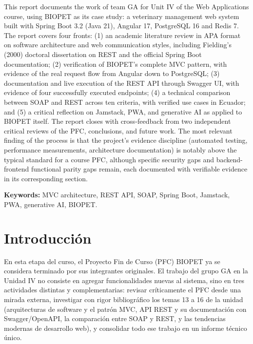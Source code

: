 \documentclass[11pt,a4paper]{article}
\begin{document}
This report documents the work of team GA for Unit IV of the Web
Applications course, using BIOPET as its case study: a veterinary
management web system built with Spring Boot 3.2 (Java 21), Angular 17,
PostgreSQL 16 and Redis 7. The report covers four fronts: (1) an academic
literature review in APA format on software architecture and web
communication styles, including Fielding's (2000) doctoral dissertation on
REST and the official Spring Boot documentation; (2) verification of
BIOPET's complete MVC pattern, with evidence of the real request flow from
Angular down to PostgreSQL; (3) documentation and live execution of the
REST API through Swagger UI, with evidence of four successfully executed
endpoints; (4) a technical comparison between SOAP and REST across ten
criteria, with verified use cases in Ecuador; and (5) a critical reflection
on Jamstack, PWA, and generative AI as applied to BIOPET itself. The report
closes with cross-feedback from two independent critical reviews of the
PFC, conclusions, and future work. The most relevant finding of the process
is that the project's evidence discipline (automated testing, performance
measurements, architecture documentation) is notably above the typical
standard for a course PFC, although specific security gaps and
backend-frontend functional parity gaps remain, each documented with
verifiable evidence in its corresponding section.

\textbf{Keywords:} MVC architecture, REST API, SOAP, Spring Boot, Jamstack,
PWA, generative AI, BIOPET.

\newpage
\tableofcontents
\newpage

\section{Introducción}

En esta etapa del curso, el Proyecto Fin de Curso (PFC) BIOPET ya se
considera terminado por sus integrantes originales. El trabajo del grupo GA
en la Unidad IV no consiste en agregar funcionalidades nuevas al sistema,
sino en tres actividades distintas y complementarias: revisar críticamente
el PFC desde una mirada externa, investigar con rigor bibliográfico los
temas 13 a 16 de la unidad (arquitecturas de software y el patrón MVC, API
REST y su documentación con Swagger/OpenAPI, la comparación entre SOAP y
REST, y las tendencias modernas de desarrollo web), y consolidar todo ese
trabajo en un informe técnico único.
\end{document}
